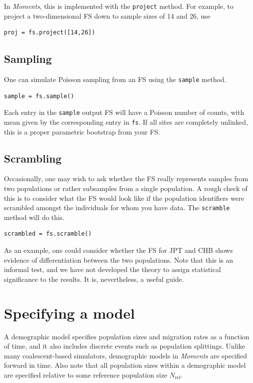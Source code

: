 \documentclass[12pt]{article}
\makeatletter
\newcommand{\Nref}{\ensuremath{N_\text{ref}}\xspace}
\newcommand{\py}[1]{\lstinline[breaklines=true,language=Python, showstringspaces=False]@#1@}
\makeatother
\begin{document}
In \textit{Moments}, this is implemented with the \py{project} method.
For example, to project a two-dimensional FS down to sample sizes of 14 and 26, use
\begin{lstlisting}
proj = fs.project([14,26])
\end{lstlisting}

\subsection{Sampling}

One can simulate Poisson sampling from an FS using the \py{sample} method.
\begin{lstlisting}
sample = fs.sample()
\end{lstlisting}
Each entry in the \py{sample} output FS will have a Poisson number of counts, with mean given by the corresponding entry in \py{fs}.
If all sites are completely unlinked, this is a proper parametric bootstrap from your FS.

\subsection{Scrambling}

Occasionally, one may wish to ask whether the FS really represents samples from two populations or rather subsamples from a single population.
A rough check of this is to consider what the FS would look like if the population identifiers were scrambled amongst the individuals for whom you have data.
The \py{scramble} method will do this.
\begin{lstlisting}
scrambled = fs.scramble()
\end{lstlisting}
As an example, one could consider whether the FS for JPT and CHB shows evidence of differentiation between the two populations.
Note that this is an informal test, and we have not developed the theory to assign statistical significance to the results.
It is, nevertheless, a useful guide.

\section{Specifying a model}

A demographic model specifies population sizes and migration rates as a function of time, and it also includes discrete events such as population splittings.
Unlike many coalescent-based simulators, demographic models in \textit{Moments} are specified forward in time.
Also note that all population sizes within a demographic model are specified relative to some reference population size \Nref.
\end{document}
